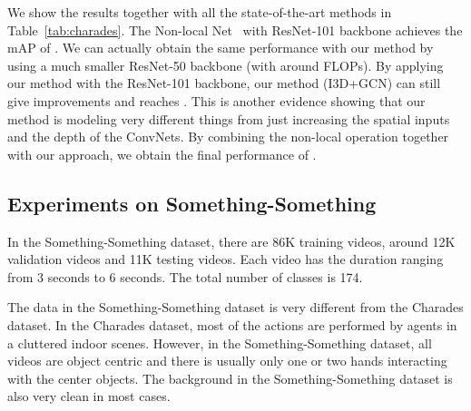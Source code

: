\documentclass[runningheads]{llncs}
\begin{document}
We show the results together with all the state-of-the-art methods in Table~\ref{tab:charades}. The Non-local Net~\cite{xiaolongwang2017nonlocal} with ResNet-101 backbone achieves the mAP of . We can actually obtain the same performance with our method by using a much smaller ResNet-50 backbone (with around  FLOPs). By applying our method with the ResNet-101 backbone, our method (I3D+GCN) can still give  improvements and reaches  . This is another evidence showing that our method is modeling very different things from just increasing the spatial inputs and the depth of the ConvNets. By combining the non-local operation together with our approach, we obtain the final performance of . 





\vspace{-0.1in}
\subsection{Experiments on Something-Something}
\vspace{-0.05in}


In the Something-Something dataset, there are 86K training videos, around 12K validation videos and 11K testing videos. Each video has the duration ranging from 3 seconds to 6 seconds. The total number of classes is 174. 

The data in the Something-Something dataset is very different from the Charades dataset. In the Charades dataset, most of the actions are performed by agents in a  cluttered indoor scenes. However, in the Something-Something dataset, all videos are object centric and there is usually only one or two hands interacting with the center objects. The background in the Something-Something dataset is also very clean in most cases. 
\end{document}
